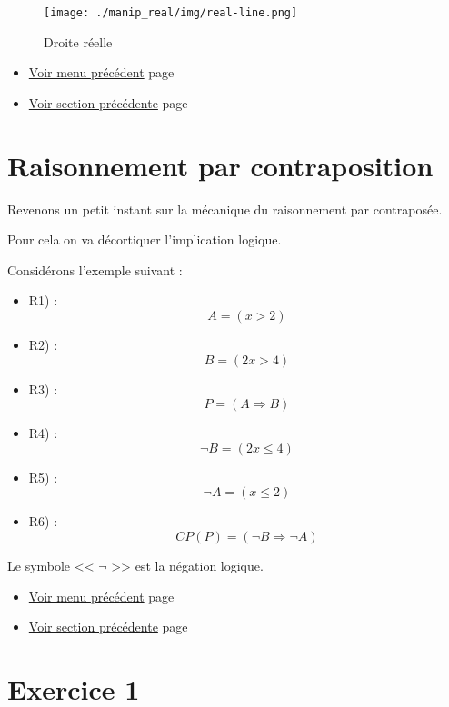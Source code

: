 \documentclass[a4paper,11pt]{book}
\begin{document}
\begin{figure}[htbp]
\centering
\texttt{[image: ./manip\_real/img/real-line.png]}
\caption{Droite réelle}
\end{figure}
\label{page:real-line}



\begin{itemize}
\item \hyperref[orga5086f2]{Voir menu précédent}
page~\pageref{page:content1-menu}
\item \hyperref[orgeac9191]{Voir section précédente}
page~\pageref{page:sec2.1.4rational}
\end{itemize}


\clearpage

\section{Raisonnement par contraposition}
\label{sec:org1062fd8}
\label{org084e38f}
\label{page:sec2.1.6cp}

Revenons un petit instant sur la mécanique du raisonnement par
contraposée.

Pour cela on va décortiquer l'implication logique.

Considérons l'exemple suivant : 

\begin{itemize}
\item R1) : \[A = (x > 2)\]
\item R2) : \[B = (2x > 4)\]
\item R3) : \[P = (A\Rightarrow B)\]
\item R4) : \[\neg B = (2x \leq 4)\]
\item R5) : \[\neg A = (x \leq 2)\]
\item R6) : \[CP(P) = (\neg B\Rightarrow \neg A)\]
\end{itemize}


Le symbole << \(\neg\) >> est la négation logique.

\begin{itemize}
\item \hyperref[orga5086f2]{Voir menu précédent}
page~\pageref{page:content1-menu}
\item \hyperref[orgff5d9b3]{Voir section précédente}
page~\pageref{page:sec2.1.5real}
\end{itemize}

\clearpage

\section{Exercice 1}
\label{sec:org885198c}
\label{orgfd91183}
\label{page:sec2.1.7exo1}
\end{document}

